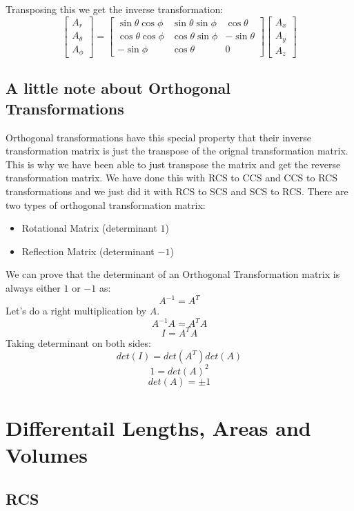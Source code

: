             Transposing this we get the inverse transformation:
            \begin{equation}
                \begin{bmatrix}
                    A_r \\ A_\theta \\ A_\phi    
                \end{bmatrix}
                =
                \begin{bmatrix}
                    \sin\theta\cos\phi & \sin\theta\sin\phi & \cos\theta \\
                    \cos\theta\cos\phi & \cos\theta\sin\phi & -\sin\theta \\
                    -\sin\phi & \cos\theta & 0
                \end{bmatrix}
                \begin{bmatrix}
                    A_x \\ A_y \\ A_z
                \end{bmatrix}
            \end{equation}
        \subsection{A little note about Orthogonal Transformations}
            Orthogonal transformations have this special property that their inverse transformation matrix is just the transpose of the orignal transformation matrix. This is why we have been able to just transpose the matrix and get the reverse transformation matrix. We have done this with RCS to CCS and CCS to RCS transformations and we just did it with RCS to SCS and SCS to RCS. 
            There are two types of orthogonal transformation matrix:
            \begin{itemize}
                \item Rotational Matrix (determinant $1$)
                \item Reflection Matrix (determinant $-1$)
            \end{itemize}
            We can prove that the determinant of an Orthogonal Transformation matrix is always either $1$ or $-1$ as:
            $$A^{-1} = A^T$$
            Let's do a right multiplication by $A$.
            $$A^{-1}A = A^TA$$
            $$I = A^TA$$
            Taking determinant on both sides:
            $$det(I) = det(A^T)det(A)$$
            $$1 = {det(A)}^2$$
            $$det(A) = \pm 1$$
    \section{Differentail Lengths, Areas and Volumes}
        \subsection{RCS}
            
